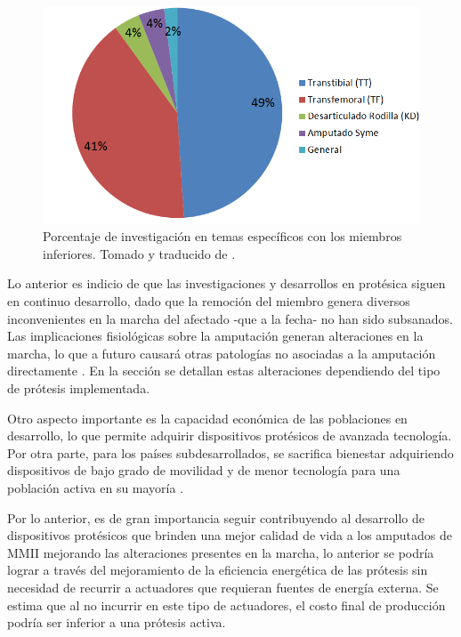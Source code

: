 \documentclass[12pt,english]{article}
\begin{document}
\begin{figure}
\begin{centering}
\includegraphics[scale=0.45]{estapies}
\par\end{centering}

\caption{\label{fig:Porcentaje-de-investigaci=0000F3n}Porcentaje de investigación
en temas específicos con los miembros inferiores. Tomado y traducido
de \cite{Eshraghi2013}. }
\end{figure}


Lo anterior es indicio de que las investigaciones y desarrollos en
protésica siguen en continuo desarrollo, dado que la remoción del
miembro genera diversos inconvenientes en la marcha del afectado -que
a la fecha- no han sido subsanados. Las implicaciones fisiológicas
sobre la amputación generan alteraciones en la marcha, lo que a futuro
causará otras patologías no asociadas a la amputación directamente
\cite{Lemoyne}. En la sección 
se detallan estas alteraciones dependiendo del tipo de prótesis implementada.

Otro aspecto importante es la capacidad económica de las poblaciones
en desarrollo, lo que permite adquirir dispositivos protésicos de avanzada tecnología. Por otra parte, para los países subdesarrollados, se sacrifica bienestar adquiriendo dispositivos de bajo grado de movilidad y de menor tecnología para una población activa en su mayoría \cite{Lemoyne}.

Por lo anterior, es de gran importancia seguir contribuyendo al desarrollo
de dispositivos protésicos que brinden una mejor calidad de vida a los amputados de MMII mejorando las alteraciones presentes en la marcha, lo anterior se podría lograr a través del mejoramiento de la eficiencia energética de las prótesis sin necesidad de recurrir a actuadores que requieran fuentes de energía externa. Se estima que al no incurrir en este tipo de actuadores, el costo final de producción podría ser inferior a una prótesis activa.
\end{document}
